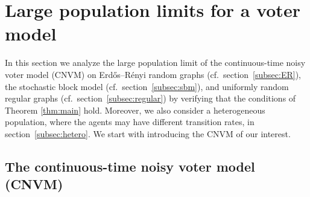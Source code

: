 \documentclass[a4paper,
               10pt,
               pdftex,
               normalheadings,
               headsepline,
               footsepline,
               headinclude,
               footinclude,
               DIV=14,
               abstracton]
{scrartcl}
\begin{document}
\section{Large population limits for a voter model} \label{sec:voter_model}

In this section we analyze the large population limit of the continuous-time noisy voter model (CNVM) on Erd\H{o}s--Rényi random graphs (cf.\ section~\ref{subsec:ER}), the stochastic block model (cf.\ section~\ref{subsec:sbm}), and uniformly random regular graphs (cf.\ section~\ref{subsec:regular}) by verifying that the conditions of Theorem \ref{thm:main} hold. Moreover, we also consider a heterogeneous population, where the agents may have different transition rates, in section~\ref{subsec:hetero}.
We start with introducing the CNVM of our interest.

\subsection{The continuous-time noisy voter model (CNVM)}
\label{subsec:CNVM}
\end{document}
